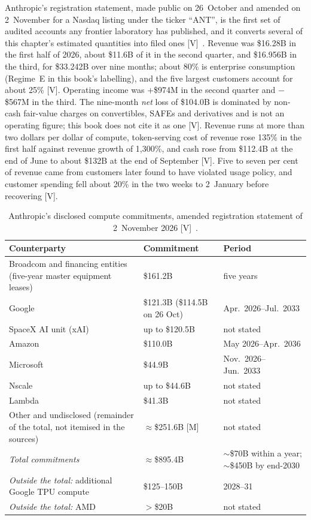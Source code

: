 Anthropic's registration statement, made public on 26~October and amended on 2~November for a Nasdaq listing under the ticker ``ANT'', is the first set of audited accounts any frontier laboratory has published, and it converts several of this chapter's estimated quantities into filed ones [V]~\cite{cap-anthropic-s1}. Revenue was \$16.28B in the first half of 2026, about \$11.6B of it in the second quarter, and \$16.956B in the third, for \$33.242B over nine months; about 80\% is enterprise consumption (Regime~E in this book's labelling), and the five largest customers account for about 25\% [V]. Operating income was $+$\$974M in the second quarter and $-$\$567M in the third. The nine-month \emph{net} loss of \$104.0B is dominated by non-cash fair-value charges on convertibles, SAFEs and derivatives and is not an operating figure; this book does not cite it as one [V]. Revenue runs at more than two dollars per dollar of compute, token-serving cost of revenue rose 135\% in the first half against revenue growth of 1,300\%, and cash rose from \$112.4B at the end of June to about \$132B at the end of September [V]. Five to seven per cent of revenue came from customers later found to have violated usage policy, and customer spending fell about 20\% in the two weeks to 2~January before recovering [V].

\begin{table}[htbp]
  \centering
  \small
  \caption{Anthropic's disclosed compute commitments, amended registration statement of 2~November 2026 [V]~\cite{cap-anthropic-s1}.}
  \label{tab:cap-s1}
  \begin{tabular}{p{70mm}p{34mm}p{34mm}}
    \toprule
    Counterparty & Commitment & Period \\
    \midrule
    Broadcom and financing entities (five-year master equipment leases) & \$161.2B & five years \\
    Google & \$121.3B (\$114.5B on 26 Oct) & Apr.\ 2026--Jul.\ 2033 \\
    SpaceX AI unit (xAI) & up to \$120.5B & not stated \\
    Amazon & \$110.0B & May 2026--Apr.\ 2036 \\
    Microsoft & \$44.9B & Nov.\ 2026--Jun.\ 2033 \\
    Nscale & up to \$44.6B & not stated \\
    Lambda & \$41.3B & not stated \\
    Other and undisclosed (remainder of the total, not itemised in the sources) & $\approx$\$251.6B [M] & not stated \\
    \addlinespace
    \emph{Total commitments} & $\approx$\$895.4B & $\sim$\$70B within a year; $\sim$\$450B by end-2030 \\
    \addlinespace
    \emph{Outside the total:} additional Google TPU compute & \$125--150B & 2028--31 \\
    \emph{Outside the total:} AMD & $>$\$20B & not stated \\
    \bottomrule
  \end{tabular}
\end{table}

